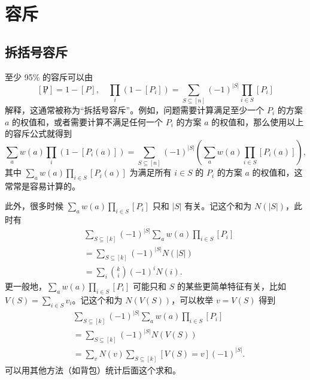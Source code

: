 \chapter{容斥}


\section{拆括号容斥}

至少 95\% 的容斥可以由
$$
[\not P]=1-[P],\quad \prod_i (1-[P_i])=\sum_{S\subseteq [n]}(-1)^{|S|}\prod_{i\in S}[P_i]
$$
解释，这通常被称为“拆括号容斥”。例如，问题需要计算满足至少一个 $P_i$ 的方案 $a$ 的权值和，或者需要计算不满足任何一个 $P_i$ 的方案 $a$ 的权值和，那么使用以上的容斥公式就得到
$$
\sum_a w(a)\prod_i (1-[P_i(a)])=\sum_{S\subseteq [n]}(-1)^{|S|}\left(\sum_a w(a)\prod_{i\in S}[P_i(a)]\right),
$$
其中 $\sum_a w(a)\prod_{i\in S}[P_i(a)]$ 为满足所有 $i\in S$ 的 $P_i$ 的方案 $a$ 的权值和，这常常是容易计算的。

此外，很多时候 $\sum_a w(a)\prod_{i\in S}[P_i]$ 只和 $|S|$ 有关。记这个和为 $N(|S|)$，此时有
$$
\begin{aligned}
&\sum_{S\subseteq [k]} (-1)^{|S|}\sum_a w(a) \prod_{i\in S}[P_i]\\
&=\sum_{S\subseteq [k]}(-1)^{|S|}N(|S|)\\
&=\sum_i\binom{k}{i}(-1)^i N(i).
\end{aligned}
$$
更一般地，$\sum_a w(a)\prod_{i\in S}[P_i]$ 可能只和 $S$ 的某些更简单特征有关，比如 $V(S)=\sum_{i\in S}v_i$。记这个和为 $N(V(S))$，可以枚举 $v=V(S)$ 得到
$$
\begin{aligned}
    &\sum_{S\subseteq [k]} (-1)^{|S|}\sum_a w(a) \prod_{i\in S}[P_i]\\
    &=\sum_{S\subseteq [k]}(-1)^{|S|}N(V(S))\\
    &=\sum_v N(v)\sum_{S\subseteq [k]}[V(S)=v](-1)^{|S|}.
\end{aligned}
$$    
可以用其他方法（如背包）统计后面这个求和。




